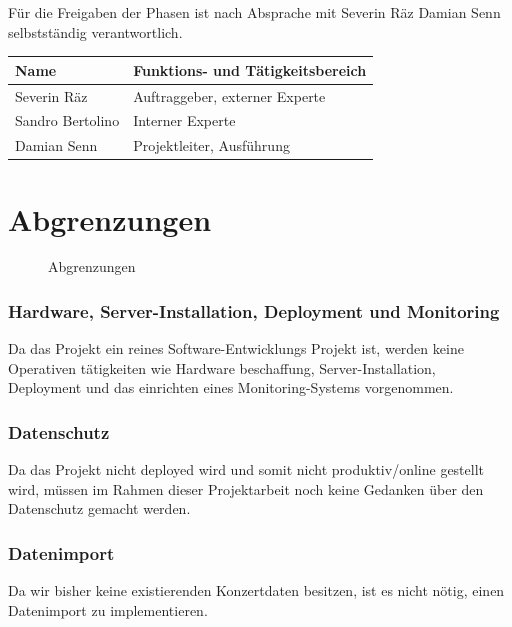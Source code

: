 Für die Freigaben der Phasen ist nach Absprache mit Severin Räz Damian Senn
selbstständig verantwortlich.

\begin{longtable}[]{@{}ll@{}}
  \toprule
  Name             & Funktions- und Tätigkeitsbereich\tabularnewline
  \midrule
  \endhead
  Severin Räz      & Auftraggeber, externer Experte\tabularnewline
  Sandro Bertolino & Interner Experte\tabularnewline
  Damian Senn      & Projektleiter, Ausführung\tabularnewline
  \bottomrule
\end{longtable}

\clearpage

\section{Abgrenzungen}\label{abgrenzungen}

\begin{figure}[!htb]
  \centering
  \def\svgwidth{\columnwidth}
  
  \caption{Abgrenzungen}
\end{figure}

\subsubsection{Hardware, Server-Installation, Deployment und
  Monitoring}\label{hardware-server-installation-deployment-und-monitoring}

Da das Projekt ein reines Software-Entwicklungs Projekt ist, werden
keine Operativen tätigkeiten wie Hardware beschaffung,
Server-Installation, Deployment und das einrichten eines
Monitoring-Systems vorgenommen.

\subsubsection{Datenschutz}\label{datenschutz}

Da das Projekt nicht deployed wird und somit nicht produktiv/online
gestellt wird, müssen im Rahmen dieser Projektarbeit noch keine Gedanken
über den Datenschutz gemacht werden.

\subsubsection{Datenimport}\label{datenimport}

Da wir bisher keine existierenden Konzertdaten besitzen, ist es nicht
nötig, einen Datenimport zu implementieren.

